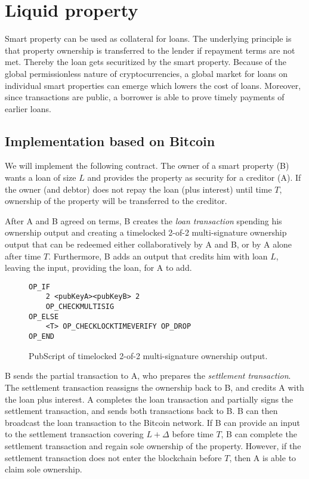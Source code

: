 \section{Liquid property}

Smart property can be used as collateral for loans. The underlying principle is that property ownership is transferred to the lender if repayment terms are not met. Thereby the loan gets securitized by the smart property. Because of the global permissionless nature of cryptocurrencies, a global market for loans on individual smart properties can emerge which lowers the cost of loans. Moreover, since transactions are public, a borrower is able to prove timely payments of earlier loans. 

\subsection{Implementation based on Bitcoin}

We will implement the following contract. The owner of a smart property (B) wants a loan of size $L$ and provides the property as security for a creditor (A). If the owner (and debtor) does not repay the loan (plus interest) until time $T$, ownership of the property will be transferred to the creditor.

After A and B agreed on terms, B creates the \emph{loan transaction} spending his ownership output and creating a timelocked 2-of-2 multi-signature ownership output that can be redeemed either collaboratively by A and B, or by A alone after time $T$. Furthermore, B adds an output that credits him with loan $L$, leaving the input, providing the loan, for A to add. 
\begin{figure}
\begin{lstlisting}
OP_IF 
    2 <pubKeyA><pubKeyB> 2
    OP_CHECKMULTISIG
OP_ELSE
    <T> OP_CHECKLOCKTIMEVERIFY OP_DROP
OP_END    
\end{lstlisting}
\caption{PubScript of timelocked 2-of-2 multi-signature ownership output.}
\end{figure}

B sends the partial transaction to A, who prepares the \emph{settlement transaction}. The settlement transaction reassigns the ownership back to B, and credits A with the loan plus interest. A completes the loan transaction and partially signs the settlement transaction, and sends both transactions back to B. B can then broadcast the loan transaction to the Bitcoin network. 
If B can provide an input to the settlement transaction covering $L+\Delta$ before time $T$, B can complete the settlement transaction and regain sole ownership of the property. However, if the settlement transaction does not enter the blockchain before $T$, then A is able to claim sole ownership.

